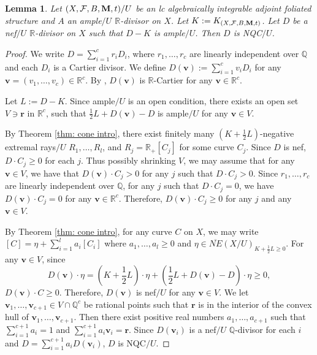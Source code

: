 \documentclass[12pt]{amsart}
\numberwithin{equation}{section}
\newcommand{\Mm}{{\bf{M}}}
\newcommand{\Qq}{\mathbb{Q}}
\newcommand{\Rr}{\mathbb{R}}
\newcommand{\Ff}{\mathcal{F}}
\newtheorem{lem}[thm]{Lemma}
\theoremstyle{definition}
\theoremstyle{definition}
\theoremstyle{definition}
\begin{document}
\begin{lem}\label{lem: nqc of K+A}
Let $(X,\Ff,B,\Mm,t)/U$ be an lc algebraically integrable adjoint foliated structure and $A$ an ample$/U$ $\Rr$-divisor on $X$. Let $K:=K_{(X,\Ff,B,\Mm,t)}$. Let $D$ be a nef$/U$ $\Rr$-divisor on $X$ such that $D-K$ is ample$/U$. Then $D$ is NQC$/U$.
\end{lem}
\begin{proof}
We write $D=\sum_{i=1}^cr_iD_i$, where $r_1,\dots,r_c$ are linearly independent over $\mathbb Q$ and each $D_i$ is a Cartier divisor. We define $D(\bm{v}):=\sum_{i=1}^cv_iD_i$ for any $\bm{v}=(v_1,\dots,v_c)\in\mathbb R^c$. By \cite[Lemma 5.3]{HLS19}, $D(\bm{v})$ is $\Rr$-Cartier for any $\bm{v}\in\mathbb R^c$. 

Let $L:=D-K$. Since ample$/U$ is an open condition, there exists an open set $V\ni\bm{r}$ in $\mathbb R^c$, such that 
$\frac{1}{2}L+D(\bm{v})-D$ is ample$/U$ for any $\bm{v}\in V$.

By Theorem \ref{thm: cone intro}, there exist finitely many $\left(K+\frac{1}{2}L\right)$-negative extremal rays$/U$ $R_1,\dots,R_l$, and $R_j=\mathbb R_+[C_j]$ for some curve $C_j$. Since $D$ is nef, $D\cdot C_j\geq 0$ for each $j$. Thus possibly shrinking $V$, we may assume that for any $\bm{v}\in V$, we have that $D(\bm{v})\cdot C_j>0$ for any $j$ such that $D\cdot C_j>0$. Since $r_1,\dots,r_c$ are linearly independent over $\mathbb Q$, for any $j$ such that $D\cdot C_j=0$, we have $D(\bm{v})\cdot C_j=0$ for any $\bm{v}\in\mathbb R^c$. Therefore,  $D(\bm{v})\cdot C_j\geq 0$ for any $j$ and any $\bm{v}\in V$.

By Theorem \ref{thm: cone intro}, for any curve $C$ on $X$, we may write
$[C]=\eta+\sum_{i=1}^l a_i[C_i]$
where $a_1,\dots,a_l\geq 0$ and $\eta\in\overline{NE}(X/U)_{K+\frac{1}{2}L\geq 0}$. For any $\bm{v}\in V$, since
$$D(\bm{v})\cdot \eta=\left(K+\frac{1}{2}L\right)\cdot \eta+\left(\frac{1}{2}L+D(\bm{v})-D\right)\cdot \eta\geq 0,$$
$D(\bm{v})\cdot C\geq 0$. Therefore, $D(\bm{v})$ is nef$/U$ for any $\bm{v}\in V$. We let $\bm{v}_1,\dots,\bm{v}_{c+1}\in V\cap\mathbb Q^c$ be rational points such that $\bm{r}$ is in the interior of the convex hull of $\bm{v}_1,\dots,\bm{v}_{c+1}$. Then there exist positive real numbers $a_1,\dots,a_{c+1}$ such that $\sum_{i=1}^{c+1}a_i=1$ and $\sum_{i=1}^{c+1}a_i\bm{v}_i=\bm{r}$. Since $D(\bm{v}_i)$ is a nef$/U$ $\Qq$-divisor for each $i$ and $D=\sum_{i=1}^{c+1}a_iD(\bm{v}_i)$, $D$ is NQC$/U$.
\end{proof}
\end{document}
